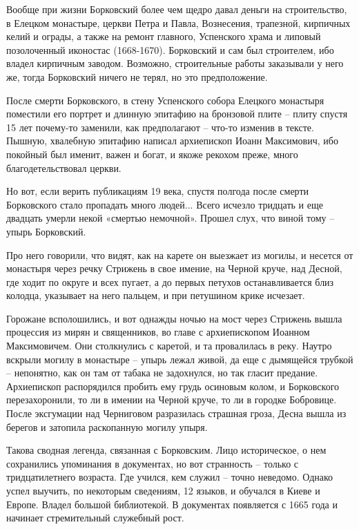 \documentclass[a5paper,11pt,openany]{article}
\begin{document}
    Вообще при жизни Борковский более чем щедро давал деньги на строительство, в Елецком монастыре, церкви Петра и Павла, Вознесения, трапезной, кирпичных келий и ограды, а также на ремонт главного, Успенского храма и липовый позолоченный иконостас (1668-1670). Борковский и сам был строителем, ибо владел кирпичным заводом. Возможно, строительные работы заказывали у него же, тогда Борковский ничего не терял, но это предположение.

   После смерти Борковского, в стену Успенского собора Елецкого монастыря поместили его портрет и длинную эпитафию на бронзовой плите – плиту спустя 15 лет почему-то заменили, как предполагают – что-то изменив в тексте. Пышную, хвалебную эпитафию написал архиепископ Иоанн Максимович, ибо покойный был именит, важен и богат, и якоже рекохом преже, много благодетельствовал церкви.

    Но вот, если верить публикациям 19 века,  
спустя полгода после смерти Борковского стало пропадать много людей... Всего исчезло тридцать и еще двадцать умерли некой «смертью немочной». Прошел слух, что виной тому – упырь Борковский. 

   Про него говорили, что видят, как на карете он выезжает из могилы, и несется от монастыря через речку Стрижень в свое имение, на Черной круче, над Десной, где ходит по округе и всех пугает, а до первых петухов останавливается близ колодца, указывает на него пальцем, и при петушином крике исчезает.

   Горожане всполошились, и вот однажды ночью на мост через Стрижень вышла процессия из мирян и священников, во главе с архиепископом Иоанном Максимовичем. Они столкнулись с каретой, и та провалилась в реку. Наутро вскрыли могилу в монастыре – упырь лежал живой, да еще с дымящейся трубкой – непонятно, как он там от табака не задохнулся, но так гласит предание. Архиепископ распорядился пробить ему грудь осиновым колом, и Борковского перезахоронили, то ли в имении на Черной круче, то ли в городке Бобровице. После эксгумации над Черниговом разразилась страшная гроза, Десна вышла из берегов и затопила раскопанную могилу упыря.

    Такова сводная легенда, связанная с Борковским. Лицо историческое, о нем сохранились упоминания в документах, но вот странность – только с тридцатилетнего возраста. Где учился, кем служил – точно неведомо. Однако успел выучить, по некоторым сведениям, 12 языков, и обучался в Киеве и Европе. Владел большой библиотекой. В документах появляется с 1665 года и начинает стремительный служебный рост.
\end{document}
